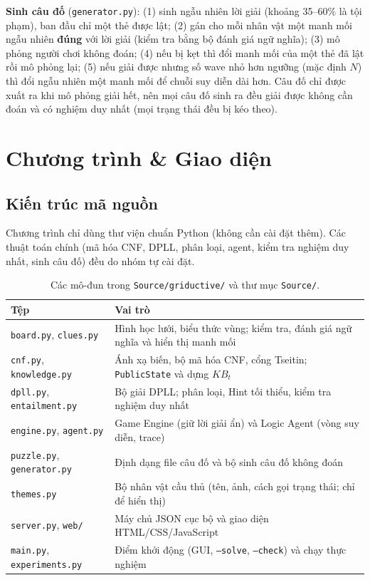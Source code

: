 \documentclass{article}
\newcommand{\code}[1]{\texttt{#1}}
\newcommand{\KB}{\mathit{KB}}
\begin{document}
\textbf{Sinh câu đố} (\code{generator.py}): (1) sinh ngẫu nhiên lời giải (khoảng 35--60\% là tội phạm), ban đầu chỉ một thẻ được lật; (2) gán cho mỗi nhân vật một manh mối ngẫu nhiên \textbf{đúng} với lời giải (kiểm tra bằng bộ đánh giá ngữ nghĩa); (3) mô phỏng người chơi không đoán; (4) nếu bị kẹt thì đổi manh mối của một thẻ đã lật rồi mô phỏng lại; (5) nếu giải được nhưng số wave nhỏ hơn ngưỡng (mặc định $N$) thì đổi ngẫu nhiên một manh mối để chuỗi suy diễn dài hơn. Câu đố chỉ được xuất ra khi mô phỏng giải hết, nên mọi câu đố sinh ra đều giải được không cần đoán và có nghiệm duy nhất (mọi trạng thái đều bị kéo theo).

\section{Chương trình \& Giao diện}

\subsection{Kiến trúc mã nguồn}
Chương trình chỉ dùng thư viện chuẩn Python (không cần cài đặt thêm). Các thuật toán chính (mã hóa CNF, DPLL, phân loại, agent, kiểm tra nghiệm duy nhất, sinh câu đố) đều do nhóm tự cài đặt.

\begin{table}[!htbp]
\centering\small
\renewcommand{\arraystretch}{1.2}
\begin{tabularx}{\textwidth}{l X}
\toprule
\textbf{Tệp} & \textbf{Vai trò} \\
\midrule
\code{board.py}, \code{clues.py} & Hình học lưới, biểu thức vùng; kiểm tra, đánh giá ngữ nghĩa và hiển thị manh mối \\
\code{cnf.py}, \code{knowledge.py} & Ánh xạ biến, bộ mã hóa CNF, cổng Tseitin; \code{PublicState} và dựng $\KB_t$ \\
\code{dpll.py}, \code{entailment.py} & Bộ giải DPLL; phân loại, Hint tối thiểu, kiểm tra nghiệm duy nhất \\
\code{engine.py}, \code{agent.py} & Game Engine (giữ lời giải ẩn) và Logic Agent (vòng suy diễn, trace) \\
\code{puzzle.py}, \code{generator.py} & Định dạng file câu đố và bộ sinh câu đố không đoán \\
\code{themes.py} & Bộ nhân vật cầu thủ (tên, ảnh, cách gọi trạng thái; chỉ để hiển thị) \\
\code{server.py}, \code{web/} & Máy chủ JSON cục bộ và giao diện HTML/CSS/JavaScript \\
\code{main.py}, \code{experiments.py} & Điểm khởi động (GUI, \code{--solve}, \code{--check}) và chạy thực nghiệm \\
\bottomrule
\end{tabularx}
\caption{Các mô-đun trong \code{Source/griductive/} và thư mục \code{Source/}.}
\end{table}
\end{document}
